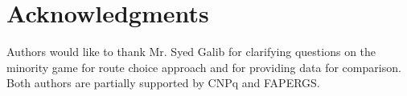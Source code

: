 \documentclass{RITA}
\begin{document}
\section{Acknowledgments}

Authors would like to thank Mr. Syed Galib for clarifying questions on the minority game for route choice approach \cite{Galib&Moser2011} and for providing data for comparison. Both authors are partially supported by CNPq and FAPERGS. %


 
\end{document}
